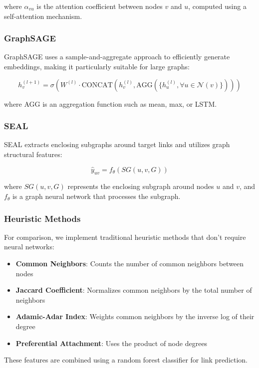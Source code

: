 \documentclass[conference]{IEEEtran}
\begin{document}
where $\alpha_{vu}$ is the attention coefficient between nodes $v$ and $u$, computed using a self-attention mechanism.

\subsubsection{GraphSAGE}
GraphSAGE uses a sample-and-aggregate approach to efficiently generate embeddings, making it particularly suitable for large graphs:

\begin{equation}
h_v^{(l+1)} = \sigma\left(W^{(l)} \cdot \textrm{CONCAT}(h_v^{(l)}, \textrm{AGG}(\{h_u^{(l)}, \forall u \in \mathcal{N}(v)\}))\right)
\end{equation}

where AGG is an aggregation function such as mean, max, or LSTM.

\subsubsection{SEAL}
SEAL extracts enclosing subgraphs around target links and utilizes graph structural features:

\begin{equation}
\hat{y}_{uv} = f_{\theta}(SG(u, v, G))
\end{equation}

where $SG(u, v, G)$ represents the enclosing subgraph around nodes $u$ and $v$, and $f_{\theta}$ is a graph neural network that processes the subgraph.

\subsubsection{Heuristic Methods}
For comparison, we implement traditional heuristic methods that don't require neural networks:
\begin{itemize}
\item \textbf{Common Neighbors}: Counts the number of common neighbors between nodes
\item \textbf{Jaccard Coefficient}: Normalizes common neighbors by the total number of neighbors
\item \textbf{Adamic-Adar Index}: Weights common neighbors by the inverse log of their degree
\item \textbf{Preferential Attachment}: Uses the product of node degrees
\end{itemize}

These features are combined using a random forest classifier for link prediction.
\end{document}
